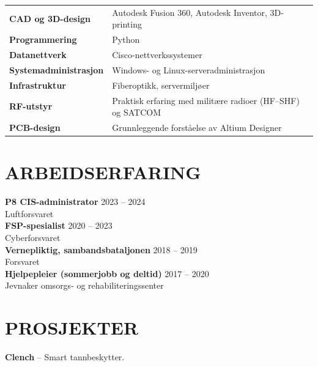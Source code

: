 \documentclass[a4paper,10pt]{article}
\begin{document}
\noindent
\begin{tabularx}{\textwidth}{@{}>{\bfseries\small}l X}
  CAD og 3D-design & Autodesk Fusion 360, Autodesk Inventor, 3D-printing \\
  Programmering   & Python \\
  Datanettverk    & Cisco-nettverkssystemer \\
  Systemadministrasjon & Windows- og Linux-serveradministrasjon \\
  Infrastruktur   & Fiberoptikk, servermiljøer \\
  RF-utstyr       & Praktisk erfaring med militære radioer (HF--SHF) og SATCOM \\
  PCB-design      & Grunnleggende forståelse av Altium Designer \\
\end{tabularx}

\section{ARBEIDSERFARING}

\noindent\textbf{P8 CIS-administrator} \hfill {\small\color{mid} 2023 -- 2024}\\
{\small Luftforsvaret}\\[0.2ex]

\noindent\textbf{FSP-spesialist} \hfill {\small\color{mid} 2020 -- 2023}\\
{\small Cyberforsvaret}\\[0.2ex]

\noindent\textbf{Vernepliktig, sambandsbataljonen} \hfill {\small\color{mid} 2018 -- 2019}\\
{\small Forsvaret}\\[0.2ex]

\noindent\textbf{Hjelpepleier (sommerjobb og deltid)} \hfill {\small\color{mid} 2017 -- 2020}\\
{\small Jevnaker omsorgs- og rehabiliteringssenter}

\section{PROSJEKTER}

\noindent\textbf{Clench} -- Smart tannbeskytter.\\[0.15ex]
\end{document}
